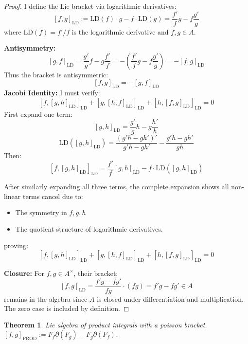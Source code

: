 \documentclass{artjlt}
\newtheorem{thm}{Theorem}
\newcommand{\?}{\textbackslash}
\begin{document}
\begin{proof}
I define the Lie bracket via logarithmic derivatives:
\[
[f,g]_{\text{LD}} := \text{LD}(f) \cdot g - f \cdot \text{LD}(g) = \frac{f'}{f}g - f\frac{g'}{g}
\]
where $\text{LD}(f) = f'/f$ is the logarithmic derivative and $f,g \in A$.

\noindent\textbf{Antisymmetry:}
\[
[g,f]_{\text{LD}} = \frac{g'}{g}f - g\frac{f'}{f} = -\left(\frac{f'}{f}g - f\frac{g'}{g}\right) = -[f,g]_{\text{LD}}
\]
Thus the bracket is antisymmetric:
\[
\boxed{[f,g]_{\text{LD}} = -[g,f]_{\text{LD}}} 
\]
\noindent\textbf{Jacobi Identity:}
I must verify:
\[
[f,[g,h]_{\text{LD}}]_{\text{LD}} + [g,[h,f]_{\text{LD}}]_{\text{LD}} + [h,[f,g]_{\text{LD}}]_{\text{LD}} = 0
\]
First expand one term:
\[
[g,h]_{\text{LD}} = \frac{g'}{g}h - g\frac{h'}{h}
\]
\[
\text{LD}([g,h]_{\text{LD}}) = \frac{(g'h - gh')'}{g'h - gh'} - \frac{g'h - gh'}{gh}
\]
Then:
\[
[f,[g,h]_{\text{LD}}]_{\text{LD}} = \frac{f'}{f}[g,h]_{\text{LD}} - f\cdot\text{LD}([g,h]_{\text{LD}})
\]

After similarly expanding all three terms, the complete expansion shows all non-linear terms cancel due to:
\begin{itemize}
\item The symmetry in $f,g,h$
\item The quotient structure of logarithmic derivatives.
\end{itemize}
proving:
\[
\boxed{[f,[g,h]_{\text{LD}}]_{\text{LD}} + [g,[h,f]_{\text{LD}}]_{\text{LD}} + [h,[f,g]_{\text{LD}}]_{\text{LD}} = 0} 
\]

\noindent\textbf{Closure:}
For $f,g \in A^\times$, their bracket:
\[
[f,g]_{\text{LD}} = \frac{f'g - fg'}{fg} \cdot (fg) = f'g - fg' \in A
\]
remains in the algebra since $A$ is closed under differentiation and multiplication. The zero case is included by definition. 
\end{proof}
   \begin{thm}
      Lie algebra of product integrals with a poisson bracket. $[f,g]_\text{PROD} := F_f \partial (F_g) - F_g \partial (F_f)$.
   \end{thm}
\end{document}
